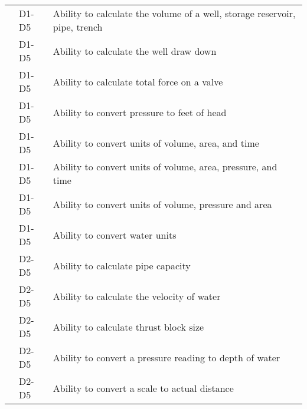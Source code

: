 \begin{table}[H]
\begin{tabular}{| m{1cm} | m{1cm} | m{12cm} |}
\multicolumn{1}{l|}{} & \multicolumn{1}{l|}{D1-D5} & Ability to calculate   the volume of a well, storage reservoir, pipe, trench \\ \cline{2-3} 
\multicolumn{1}{l|}{} & \multicolumn{1}{l|}{D1-D5} & Ability to calculate   the well draw down                                    \\ \cline{2-3} 
\multicolumn{1}{l|}{} & \multicolumn{1}{l|}{D1-D5} & Ability to calculate   total force on a valve                                \\ \cline{2-3} 
\multicolumn{1}{l|}{} & \multicolumn{1}{l|}{D1-D5} & Ability to convert   pressure to feet of head                                \\ \cline{2-3} 
\multicolumn{1}{l|}{} & \multicolumn{1}{l|}{D1-D5} & Ability to convert   units of volume, area, and time                         \\ \cline{2-3} 
\multicolumn{1}{l|}{} & \multicolumn{1}{l|}{D1-D5} & Ability to convert   units of volume, area, pressure, and time               \\ \cline{2-3} 
\multicolumn{1}{l|}{} & \multicolumn{1}{l|}{D1-D5} & Ability to convert   units of volume, pressure and area                      \\ \cline{2-3} 
\multicolumn{1}{l|}{} & \multicolumn{1}{l|}{D1-D5} & Ability to convert   water units                                             \\ \cline{2-3} 
\multicolumn{1}{l|}{} & \multicolumn{1}{l|}{D2-D5} & Ability to calculate   pipe capacity                                         \\ \cline{2-3} 
\multicolumn{1}{l|}{} & \multicolumn{1}{l|}{D2-D5} & Ability to calculate   the velocity of water                                 \\ \cline{2-3} 
\multicolumn{1}{l|}{} & \multicolumn{1}{l|}{D2-D5} & Ability to calculate   thrust block size                                     \\ \cline{2-3} 
\multicolumn{1}{l|}{} & \multicolumn{1}{l|}{D2-D5} & Ability to convert a   pressure reading to depth of water                    \\ \cline{2-3} 
\multicolumn{1}{l|}{} & \multicolumn{1}{l|}{D2-D5} & Ability to convert a   scale to actual distance                              \\ \cline{2-3} 
\end{tabular}
\end{table}
\newpage






